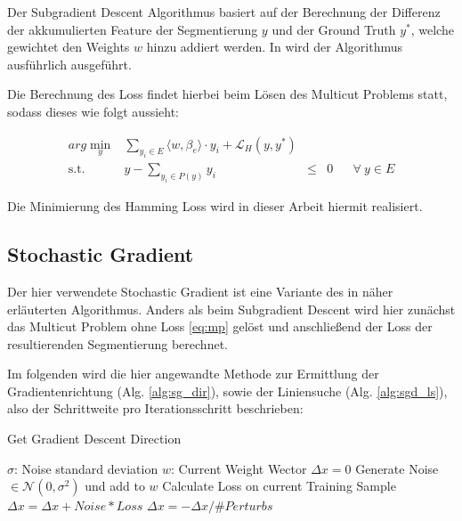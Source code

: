 Der Subgradient Descent Algorithmus basiert auf der Berechnung der Differenz der akkumulierten Feature der Segmentierung $y$ und der Ground Truth $y^*$, welche gewichtet den Weights $w$ hinzu addiert werden. In \cite{NowozinStrucLearn11} wird der Algorithmus ausführlich ausgeführt. 

Die Berechnung des Loss findet hierbei beim Lösen des Multicut Problems statt, sodass dieses wie folgt aussieht:

\begin{equation} 
\begin{array}{rrclcl}
\displaystyle arg \min_{y} & \sum\limits_{y_i \in E} \langle w, \beta_e \rangle \cdot y_i + \mathcal{L}_H(y, y^*) \\
\textrm{s.t.} &  y - \sum\limits_{y_i \in P(y)} y_i & \le & 0 & & \forall \ y \in E
\end{array}
\label{eq:mp-hamming}
\end{equation}

Die Minimierung des Hamming Loss wird in dieser Arbeit hiermit realisiert.

\subsection{Stochastic Gradient}

Der hier verwendete Stochastic Gradient ist eine Variante des in \cite{NowozinStrucLearn11} näher erläuterten Algorithmus. Anders als beim Subgradient Descent wird hier zunächst das Multicut Problem ohne Loss \eqref{eq:mp} gelöst und anschließend der Loss der resultierenden Segmentierung berechnet.

Im folgenden wird die hier angewandte Methode zur Ermittlung der Gradientenrichtung (Alg. \ref{alg:sg_dir}), sowie der Liniensuche (Alg. \ref{alg:sgd_ls}), also der Schrittweite pro Iterationsschritt beschrieben: \\

\begin{algorithm}[H]
\caption{Get Gradient Descent Direction}\label{alg:sg_dir}
\begin{algorithmic}[1]
	\State $\sigma$: Noise standard deviation
	\State $w$: Current Weight Wector
	\State
	\State $\Delta x = 0$
		\State Generate Noise $\in \mathcal{N}(0, \sigma^2)$ und add to $w$
		\State Calculate Loss on current Training Sample
		\State $\Delta x = \Delta x + Noise*Loss$
	\EndFor
	\State $\Delta x = -\Delta x / \#Perturbs$
	\State {}
\EndProcedure
\end{algorithmic}
\end{algorithm}

